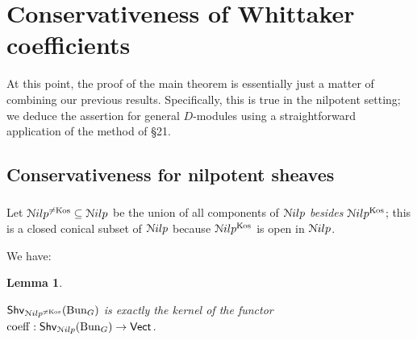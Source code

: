 \documentclass[reqno,11pt]{amsart}
\numberwithin{equation}{subsection}
\newtheorem{lem}[thm]{Lemma}
\theoremstyle{remark}
\newcommand{\sN}{{\EuScript N}}
\newcommand{\on}{\operatorname}
\newcommand{\Vect}{\mathsf{Vect}}
\newcommand{\Bun}{\on{Bun}}
\renewcommand{\subset}{\subseteq}
\newcommand{\coeff}{\on{coeff}}
\newcommand{\Shv}{\mathsf{Shv}}
\newcommand{\Nilp}{\sN ilp}
\newcommand{\Kos}{\on{Kos}}
\begin{document}
\section{Conservativeness of Whittaker coefficients}\label{s:finale}

At this point, the proof of the main theorem 
is essentially just a matter of combining our previous results.
Specifically, this is true in the nilpotent setting; we deduce
the assertion for general $D$-modules using a straightforward
application of the method of \cite{agkrrv1} \S 21.

\subsection{Conservativeness for nilpotent sheaves}

\subsubsection{}

Let $\Nilp^{\neq\Kos} \subset \Nilp$ be the union of all
components of $\Nilp$ \emph{besides} $\Nilp^{\Kos}$;
this is a closed conical subset of $\Nilp$ because $\Nilp^{\Kos}$
is open in $\Nilp$.

We have:

\begin{lem}\label{l:cons-kos}

$\Shv_{\Nilp^{\neq \Kos}}(\Bun_G)$ is exactly the kernel
of the functor $\coeff:\Shv_{\Nilp}(\Bun_G) \to \Vect$.

\end{lem}
\end{document}
